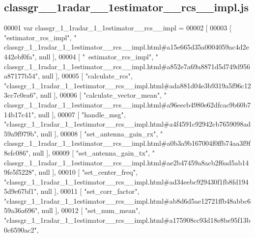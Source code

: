 \subsection{classgr\+\_\+\_\+1radar\+\_\+\_\+1estimator\+\_\+\+\_\+rcs\+\_\+\+\_\+impl.\+js}
\label{classgr__1__1radar__1__1estimator____rcs____impl_8js_source}

\begin{DoxyCode}
00001 var classgr_1_1radar_1_1estimator__rcs__impl =
00002 [
00003     [ \textcolor{stringliteral}{"estimator\_rcs\_impl"}, \textcolor{stringliteral}{"
      classgr\_1\_1radar\_1\_1estimator\_\_rcs\_\_impl.html#a15e665d35a0004059ac4d2e442ebf0fa"}, null ],
00004     [ \textcolor{stringliteral}{"~estimator\_rcs\_impl"}, \textcolor{stringliteral}{"
      classgr\_1\_1radar\_1\_1estimator\_\_rcs\_\_impl.html#a852e7a69a8871d5d749d956a87177b54"}, null ],
00005     [ \textcolor{stringliteral}{"calculate\_rcs"}, \textcolor{stringliteral}{"classgr\_1\_1radar\_1\_1estimator\_\_rcs\_\_impl.html#ada881d04e3b9319a5f96c123cc7c0ea6"}, 
      null ],
00006     [ \textcolor{stringliteral}{"calculate\_vector\_mean"}, \textcolor{stringliteral}{"
      classgr\_1\_1radar\_1\_1estimator\_\_rcs\_\_impl.html#a96eecb4980e62dfcac9b60b714b17c41"}, null ],
00007     [ \textcolor{stringliteral}{"handle\_msg"}, \textcolor{stringliteral}{"classgr\_1\_1radar\_1\_1estimator\_\_rcs\_\_impl.html#a4f4591c92942cb7659098ad59a9f979b"}, null
       ],
00008     [ \textcolor{stringliteral}{"set\_antenna\_gain\_rx"}, \textcolor{stringliteral}{"
      classgr\_1\_1radar\_1\_1estimator\_\_rcs\_\_impl.html#a0b3a9b167004f0ffb74aa3f9f8efc086"}, null ],
00009     [ \textcolor{stringliteral}{"set\_antenna\_gain\_tx"}, \textcolor{stringliteral}{"
      classgr\_1\_1radar\_1\_1estimator\_\_rcs\_\_impl.html#ae2b47459a8acb2f6ad5ab149fe5f5228"}, null ],
00010     [ \textcolor{stringliteral}{"set\_center\_freq"}, \textcolor{stringliteral}{"classgr\_1\_1radar\_1\_1estimator\_\_rcs\_\_impl.html#ad34eebc929430f1fb8fd1945d9e67bf1"},
       null ],
00011     [ \textcolor{stringliteral}{"set\_corr\_factor"}, \textcolor{stringliteral}{"classgr\_1\_1radar\_1\_1estimator\_\_rcs\_\_impl.html#ab8d6d5ae12721ffb48abbc659a36a696"},
       null ],
00012     [ \textcolor{stringliteral}{"set\_num\_mean"}, \textcolor{stringliteral}{"classgr\_1\_1radar\_1\_1estimator\_\_rcs\_\_impl.html#a175908cc93d18e8be95f13b0c6590ac2"}, 

\end{DoxyCode}
